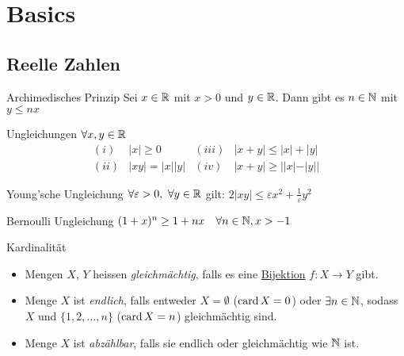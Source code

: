 \section{Basics}

\subsection{Reelle Zahlen}

\begin{corollary}{Archimedisches Prinzip}
    Sei $x \in \mathbb{R}$ mit $x > 0$ und $y \in \mathbb{R}$. Dann gibt es $n \in \mathbb{N}$ mit $y \leq nx$
\end{corollary}

\begin{theorem}{Ungleichungen}
    $\forall x,y \in \mathbb{R}$
    \begin{equation*}
        \begin{array}{lclc}
            (i) & |x| \geq 0 & (iii) & |x+y| \leq |x| + |y|\\
            (ii) & |xy| = |x||y| & (iv) & |x+y| \geq ||x| - |y||
        \end{array}
    \end{equation*}
\end{theorem}

\begin{theorem}{Young'sche Ungleichung}
       $\forall \varepsilon > 0,~\forall y \in \mathbb{R}$ gilt:
       \hspace{1mm}
       $2 |xy| \leq \varepsilon x^2 + \frac{1}{\varepsilon} y^2$
\end{theorem}

\begin{lemma}{Bernoulli Ungleichung}
    $(1 + x)^n \geq 1 + nx \quad \forall n \in \mathbb{N}, x > -1$
\end{lemma}

\begin{definition}{Kardinalität}
    \begin{itemize}
        \item Mengen $X$, $Y$ heissen \emph{gleichmächtig}, falls es eine \underline{Bijektion} $f: X \to Y$ gibt.
        \item Menge $X$ ist \emph{endlich}, falls entweder $X = \emptyset$ ($\operatorname{card} X = 0$) oder $\exists n \in \mathbb{N}$, sodass $X$ und $\{1,2,\ldots,n\}$ ($\operatorname{card} X = n$) gleichmächtig sind.
        \item Menge $X$ ist \emph{abzählbar}, falls sie endlich oder gleichmächtig wie $\mathbb{N}$ ist.
    \end{itemize}
\end{definition}

